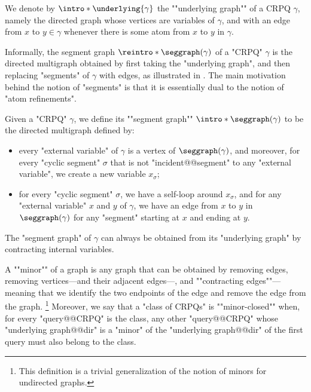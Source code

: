 We denote by \AP$\intro*\underlying{\gamma}$ the ""underlying graph"" of a CRPQ $\gamma$,
namely the directed graph whose vertices are variables of $\gamma$,
and with an edge from $x$ to $y\in \gamma$ whenever there is some atom from $x$ to $y$ in $\gamma$.

Informally, the segment graph $\reintro*\seggraph(\gamma)$ of a "CRPQ" $\gamma$ is the directed multigraph obtained by first taking the "underlying graph", and then replacing "segments" of $\gamma$ with edges, as illustrated in . The main motivation behind the notion of "segments" is 
that it is essentially dual to the notion of "atom refinements".

\begin{definition}
	\AP\label{defn:segmentgraph}
	Given a "CRPQ" $\gamma$, we define its \AP""segment graph"" $\intro*\seggraph(\gamma)$
	to be the directed multigraph defined by:
	\begin{itemize}
		\item every "external variable" of $\gamma$ is a vertex of $\seggraph(\gamma)$,
			and moreover, for every "cyclic segment" $\sigma$
			that is not "incident@@segment" to any "external variable", we create a new variable
			$x_\sigma$;
		\item for every "cyclic segment" $\sigma$, we have a self-loop around $x_{\sigma}$,
			and for any "external variable" $x$ and $y$ of $\gamma$, we have an edge
			from $x$ to $y$ in $\seggraph(\gamma)$ for any "segment" starting at $x$ and
			ending at $y$.
	\end{itemize}
\end{definition}

\begin{fact}
	\AP\label{fact:segment-graph-is-contraction}
	The "segment graph" of $\gamma$ can always be obtained from its "underlying
	graph" by contracting internal variables. 
\end{fact}

A \AP""minor"" of a graph is any graph that can be obtained by removing
edges, removing vertices---and their adjacent edges---, and \AP""contracting edges""---meaning that we identify the two endpoints of the edge and remove the edge from the graph.%
\footnote{This definition is a trivial generalization of the notion of minors for undirected graphs.} Moreover, we say that a "class of CRPQs" is ""minor-closed"" when, for every
"query@@CRPQ" is the class, any other "query@@CRPQ" whose "underlying graph@@dir" 
is a "minor" of the "underlying graph@@dir" of the first query must also
belong to the class.

